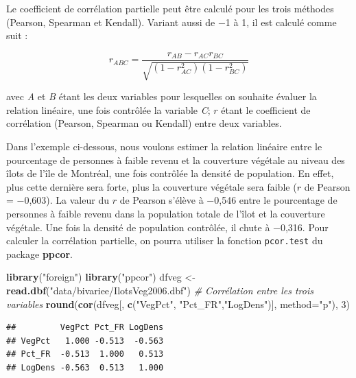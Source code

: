 \documentclass[
  11pt,
  french,
]{book}
\makeatletter
\newenvironment{Shaded}{\begin{snugshade}}{\end{snugshade}}
\newcommand{\CommentTok}[1]{\textcolor[rgb]{0.56,0.35,0.01}{\textit{#1}}}
\newcommand{\DataTypeTok}[1]{\textcolor[rgb]{0.13,0.29,0.53}{#1}}
\newcommand{\DecValTok}[1]{\textcolor[rgb]{0.00,0.00,0.81}{#1}}
\newcommand{\KeywordTok}[1]{\textcolor[rgb]{0.13,0.29,0.53}{\textbf{#1}}}
\newcommand{\NormalTok}[1]{#1}
\newcommand{\StringTok}[1]{\textcolor[rgb]{0.31,0.60,0.02}{#1}}
\newenvironment{kframe}{%
\medskip{}
\setlength{\fboxsep}{.8em}
 \def\at@end@of@kframe{}%
 \ifinner\ifhmode%
  \def\at@end@of@kframe{\end{minipage}}%
  \begin{minipage}{\columnwidth}%
 \fi\fi%
 \def\FrameCommand##1{\hskip\@totalleftmargin \hskip-\fboxsep
 \colorbox{shadecolor}{##1}\hskip-\fboxsep
     \hskip-\linewidth \hskip-\@totalleftmargin \hskip\columnwidth}%
 \MakeFramed {\advance\hsize-\width
   \@totalleftmargin\z@ \linewidth\hsize
   \@setminipage}}%
 {\par\unskip\endMakeFramed%
 \at@end@of@kframe}
\renewenvironment{Shaded}{\begin{kframe}}{\end{kframe}}
\makeatother
\begin{document}
Le coefficient de corrélation partielle peut être calculé pour les trois méthodes (Pearson, Spearman et Kendall). Variant aussi de −1 à 1, il est calculé comme suit :

\begin{equation} 
r_{ABC} = \frac{r_{AB}-r_{AC}r_{BC}}{\sqrt{(1-r_{AC}^2)(1-r_{BC}^2)}}
\label{eq:corpartielle}
\end{equation}

avec \emph{A} et \emph{B} étant les deux variables pour lesquelles on souhaite évaluer la relation linéaire, une fois contrôlée la variable \emph{C}; \(r\) étant le coefficient de corrélation (Pearson, Spearman ou Kendall) entre deux variables.

Dans l'exemple ci-dessous, nous voulons estimer la relation linéaire entre le pourcentage de personnes à faible revenu et la couverture végétale au niveau des îlots de l'île de Montréal, une fois contrôlée la densité de population. En effet, plus cette dernière sera forte, plus la couverture végétale sera faible (\(r\) de Pearson = −0,603). La valeur du \(r\) de Pearson s'élève à −0,546 entre le pourcentage de personnes à faible revenu dans la population totale de l'îlot et la couverture végétale. Une fois la densité de population contrôlée, il chute à −0,316. Pour calculer la corrélation partielle, on pourra utiliser la fonction \texttt{pcor.test} du package \textbf{ppcor}.

\begin{Shaded}
\begin{Highlighting}[]
\KeywordTok{library}\NormalTok{(}\StringTok{"foreign"}\NormalTok{)}
\KeywordTok{library}\NormalTok{(}\StringTok{"ppcor"}\NormalTok{)}
\NormalTok{dfveg <-}\StringTok{ }\KeywordTok{read.dbf}\NormalTok{(}\StringTok{"data/bivariee/IlotsVeg2006.dbf"}\NormalTok{)}
\CommentTok{# Corrélation entre les trois variables}
\KeywordTok{round}\NormalTok{(}\KeywordTok{cor}\NormalTok{(dfveg[, }\KeywordTok{c}\NormalTok{(}\StringTok{"VegPct"}\NormalTok{, }\StringTok{"Pct_FR"}\NormalTok{,}\StringTok{"LogDens"}\NormalTok{)], }\DataTypeTok{method=}\StringTok{"p"}\NormalTok{), }\DecValTok{3}\NormalTok{)}
\end{Highlighting}
\end{Shaded}

\begin{verbatim}
##         VegPct Pct_FR LogDens
## VegPct   1.000 -0.513  -0.563
## Pct_FR  -0.513  1.000   0.513
## LogDens -0.563  0.513   1.000
\end{verbatim}
\end{document}
